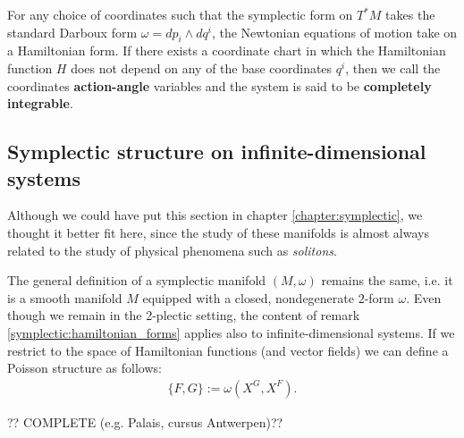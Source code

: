     For any choice of coordinates such that the symplectic form on $T^*M$ takes the standard Darboux form $\omega=dp_i\wedge dq^i$, the Newtonian equations of motion take on a Hamiltonian form. If there exists a coordinate chart in which the Hamiltonian function $H$ does not depend on any of the base coordinates $q^i$, then we call the coordinates \textbf{action-angle} variables and the system is said to be \textbf{completely integrable}.

\subsection{Symplectic structure on infinite-dimensional systems}

    Although we could have put this section in chapter \ref{chapter:symplectic}, we thought it better fit here, since the study of these manifolds is almost always related to the study of physical phenomena such as \textit{solitons}.

    The general definition of a symplectic manifold $(M, \omega)$ remains the same, i.e. it is a smooth manifold $M$ equipped with a closed, nondegenerate $2$-form $\omega$. Even though we remain in the 2-plectic setting, the content of remark \ref{symplectic:hamiltonian_forms} applies also to infinite-dimensional systems. If we restrict to the space of Hamiltonian functions (and vector fields) we can define a Poisson structure as follows:
    \begin{gather}
        \{F, G\} := \omega(X^G, X^F).
    \end{gather}

    ?? COMPLETE (e.g. Palais, cursus Antwerpen)??